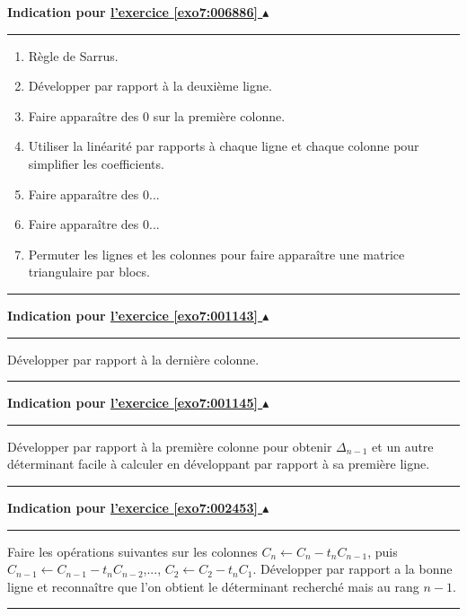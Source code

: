 \documentclass[11pt,a4paper]{article}
\newcommand{\noindication}{}
\newcounter{exo}
\newcommand{\indication}[1]{\hypertarget{ind7:#1}{}\label{ind7:#1}{\bf Indication pour \hyperlink{exo7:#1}{l'exercice \ref{exo7:#1} $\blacktriangle$}}\vspace{1mm}\hrule\vspace{1mm}}
\newcommand{\finindication}{\vspace{1mm}\hrule\vspace*{7mm}}
\begin{document}
\noindication
\noindication
\indication{006886}
\begin{enumerate}
  \item Règle de Sarrus.
  \item Développer par rapport à la deuxième ligne.
  \item Faire apparaître des $0$ sur la première colonne.
  \item Utiliser la linéarité par rapports à chaque ligne et chaque colonne
pour simplifier les coefficients.
  \item Faire apparaître des $0$...
  \item Faire apparaître des $0$...
  \item Permuter les lignes et les colonnes pour faire apparaître une matrice triangulaire
par blocs.
\end{enumerate}
\finindication
\noindication
\indication{001143}
Développer par rapport à la dernière colonne.
\finindication
\indication{001145}
Développer par rapport à la première colonne
pour obtenir $\Delta_{n-1}$ et un autre déterminant facile à calculer
en développant par rapport à sa première ligne.
\finindication
\indication{002453}
Faire les opérations suivantes sur les colonnes
$C_n \leftarrow C_n-t_n C_{n-1}$,
puis $C_{n-1} \leftarrow C_{n-1}-t_n C_{n-2}$,...,
$C_2 \leftarrow  C_2-t_nC_1$.
Développer par rapport a la bonne ligne et reconnaître
que l'on obtient le déterminant recherché mais au rang $n-1$.
\finindication


\newpage
\end{document}

